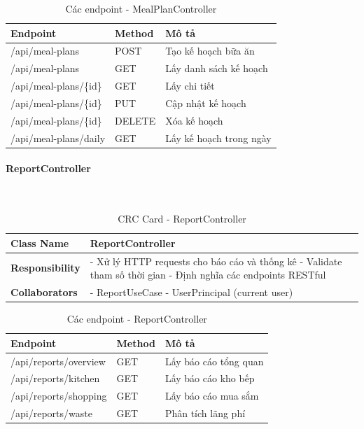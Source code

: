 \begin{table}[H]
\small
\renewcommand{\arraystretch}{1.3}
\begin{tabularx}{\textwidth}{|>{\raggedright\arraybackslash}p{4.5cm}|>{\raggedright\arraybackslash}p{2cm}|X|}
\hline
\rowcolor{gray!20}
\textbf{Endpoint} & \textbf{Method} & \textbf{Mô tả} \\
\hline
/api/meal-plans & POST & Tạo kế hoạch bữa ăn \\
\hline
/api/meal-plans & GET & Lấy danh sách kế hoạch \\
\hline
/api/meal-plans/\{id\} & GET & Lấy chi tiết \\
\hline
/api/meal-plans/\{id\} & PUT & Cập nhật kế hoạch \\
\hline
/api/meal-plans/\{id\} & DELETE & Xóa kế hoạch \\
\hline
/api/meal-plans/daily & GET & Lấy kế hoạch trong ngày \\
\hline
\end{tabularx}
\caption{Các endpoint - MealPlanController}
\end{table}

\paragraph{ReportController} ~\\

\begin{table}[H]
\small
\renewcommand{\arraystretch}{1.3}
\begin{tabularx}{\textwidth}{|>{\raggedright\arraybackslash}p{3.5cm}|X|}
\hline
\rowcolor{gray!20}
\textbf{Class Name} & ReportController \\
\hline
\textbf{Responsibility} & - Xử lý HTTP requests cho báo cáo và thống kê \newline - Validate tham số thời gian \newline - Định nghĩa các endpoints RESTful \\
\hline
\textbf{Collaborators} & - ReportUseCase \newline - UserPrincipal (current user) \\
\hline
\end{tabularx}
\caption{CRC Card - ReportController}
\end{table}

\begin{table}[H]
\small
\renewcommand{\arraystretch}{1.3}
\begin{tabularx}{\textwidth}{|>{\raggedright\arraybackslash}p{4.5cm}|>{\raggedright\arraybackslash}p{2cm}|X|}
\hline
\rowcolor{gray!20}
\textbf{Endpoint} & \textbf{Method} & \textbf{Mô tả} \\
\hline
/api/reports/overview & GET & Lấy báo cáo tổng quan \\
\hline
/api/reports/kitchen & GET & Lấy báo cáo kho bếp \\
\hline
/api/reports/shopping & GET & Lấy báo cáo mua sắm \\
\hline
/api/reports/waste & GET & Phân tích lãng phí \\
\hline
\end{tabularx}
\caption{Các endpoint - ReportController}
\end{table}

